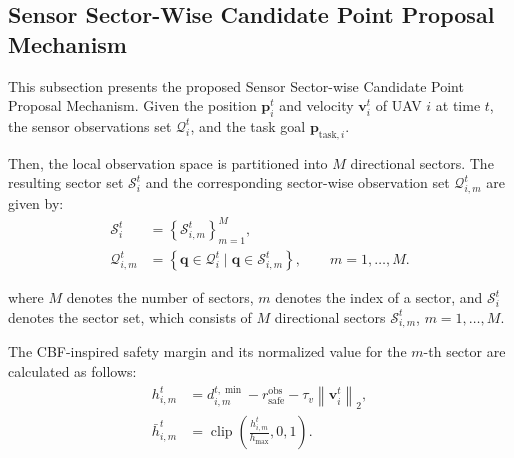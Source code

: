 

\subsection{Sensor Sector-Wise Candidate Point Proposal Mechanism}

This subsection presents the proposed Sensor Sector-wise Candidate Point Proposal Mechanism. Given the position $\mathbf{p}_i^t$ and velocity $\mathbf{v}_i^t$ of UAV $i$ at time $t$, the sensor observations set $\mathcal{Q}_i^t$, and the task goal $\mathbf{p}_{\mathrm{task},i}$.

Then, the local observation space is partitioned into $M$ directional sectors.
The resulting sector set $\mathcal{S}_i^t$ and the corresponding sector-wise observation set $\mathcal{Q}_{i,m}^t$ are given by:
\begin{equation}
    \label{eq:sector}
    \begin{aligned}
        \mathcal{S}_i^t
        &= \left\{\mathcal{S}_{i,m}^t\right\}_{m=1}^{M}, \\
        \mathcal{Q}_{i,m}^t
        &= \left\{
        \mathbf{q}\in\mathcal{Q}_i^t
        \mid
        \mathbf{q}\in\mathcal{S}_{i,m}^t
        \right\},
        \qquad m=1,\ldots,M .
    \end{aligned}
\end{equation}

\noindent
where $M$ denotes the number of sectors, $m$ denotes the index of a sector, and $\mathcal{S}_i^t$ denotes the sector set, which consists of $M$ directional sectors $\mathcal{S}_{i,m}^t$, $m=1,\ldots,M$.

The CBF-inspired safety margin and its normalized value for the $m$-th sector are calculated as follows:
\begin{equation}
    \label{eq:sector_safety_margin}
    \begin{aligned}
        h_{i,m}^t
        &= d_{i,m}^{t,\min}
        - r_{\mathrm{safe}}^{\mathrm{obs}}
        - \tau_v \left\|\mathbf{v}_i^t\right\|_2, \\
        \bar{h}_{i,m}^t
        &= \operatorname{clip}
        \left(
        \frac{h_{i,m}^t}{h_{\max}},
        0,1
        \right).
    \end{aligned}
\end{equation}

